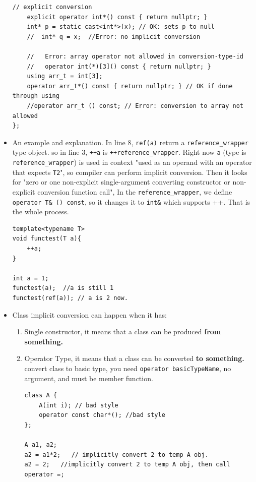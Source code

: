 \documentclass[a4paper,11pt,twoside]{book}
\begin{document}
\begin{itemize}
\begin{lstlisting}[numbers=none]
	// explicit conversion
	explicit operator int*() const { return nullptr; }
	int* p = static_cast<int*>(x); // OK: sets p to null
	//  int* q = x;  //Error: no implicit conversion
	
	//   Error: array operator not allowed in conversion-type-id
	//   operator int(*)[3]() const { return nullptr; }
	using arr_t = int[3];
	operator arr_t*() const { return nullptr; } // OK if done through using
	//operator arr_t () const; // Error: conversion to array not allowed
};
\end{lstlisting}	
	
	\item An example and explanation. In line 8, \texttt{ref(a)} return a \texttt{reference\_wrapper} type object. so in line 3, \texttt{++a} is \texttt{++reference\_wrapper}. Right now \texttt{a} (type is \texttt{reference\_wrapper}) is used in context "used as an operand with an operator that expects \texttt{T2}", so compiler can perform implicit conversion. Then it looks for "zero or one non-explicit single-argument converting constructor or non-explicit conversion function call", In the \texttt{reference\_wrapper}, we define \texttt{operator T\& () const}, so it changes it to \texttt{int\&} which supports ++. That is the whole process. 
\begin{lstlisting}[]
template<typename T>
void functest(T a){
	++a;
}

int a = 1;
functest(a);  //a is still 1
functest(ref(a)); // a is 2 now.	 
\end{lstlisting}	
	
	\item Class implicit conversion can happen when it has:
	\begin{enumerate}
		\item Single constructor, it means that a class can be produced \textbf{from something.}
		\item Operator Type, it means that a class can be converted \textbf{to something.} convert class to basic type, you need \texttt{operator basicTypeName}, no argument, and must be member function.

\begin{lstlisting}
class A {
	A(int i); // bad style
	operator const char*(); //bad style
};
	
A a1, a2;
a2 = a1*2;   // implicitly convert 2 to temp A obj.
a2 = 2;   //implicitly convert 2 to temp A obj, then call operator =;
\end{lstlisting}
	\end{enumerate}
	

\end{itemize}
\end{document}
